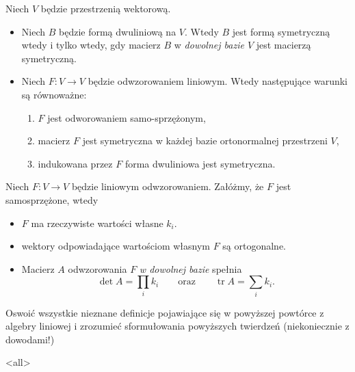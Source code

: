 \begin{frame}[<+->]


\begin{lemat}\label{lem:alg-lin-2}
Niech $V$ będzie przestrzenią wektorową.
\begin{itemize}
\item Niech $B$ będzie formą dwuliniową na $V$. Wtedy $B$ jest formą symetryczną wtedy i tylko wtedy, gdy macierz $B$ w \textit{dowolnej bazie $V$} jest macierzą symetryczną.
\item Niech $F\colon V\to V$ będzie odwzorowaniem liniowym. Wtedy następujące warunki są równoważne:
\begin{enumerate}
\item $F$ jest odworowaniem samo-sprzężonym,
\item macierz $F$ jest symetryczna w każdej bazie ortonormalnej przestrzeni $V$,
\item indukowana przez $F$ forma dwuliniowa jest symetryczna.
\end{enumerate}

\end{itemize}
\end{lemat}

\end{frame}
\begin{frame}[<+->]

\begin{lemat}\label{lem:alg-lin-2-eigen}
Niech $F\colon V\to V$ będzie liniowym odwzorowaniem. Załóżmy, że $F$ jest samosprzężone, wtedy

\begin{itemize}
\item $F$ ma rzeczywiste wartości własne $k_i$.
\item wektory odpowiadające wartościom własnym $F$ są ortogonalne.
\item Macierz $A$ odwzorowania $F$ \textit{w dowolnej bazie} spełnia
\[\det A=\prod_i k_i\qquad \text{oraz}\qquad \operatorname{tr} A=\sum_i k_i.\]

\end{itemize}

\end{lemat}

\begin{exercise}
Oswoić wszystkie nieznane definicje pojawiające się w powyższej powtórce z algebry liniowej i zrozumieć sformułowania powyższych twierdzeń (niekoniecznie z dowodami!)

\end{exercise}
\end{frame}

\mode<all> 
